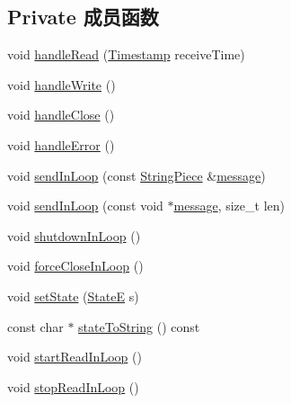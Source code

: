 \subsection*{Private 成员函数}
\begin{DoxyCompactItemize}
\item 
void \hyperlink{classmuduo_1_1net_1_1TcpConnection_afca05707020dd916739c07555d4769a0}{handle\+Read} (\hyperlink{classmuduo_1_1Timestamp}{Timestamp} receive\+Time)
\item 
void \hyperlink{classmuduo_1_1net_1_1TcpConnection_ae1d79ff6580eaced59a900144818150d}{handle\+Write} ()
\item 
void \hyperlink{classmuduo_1_1net_1_1TcpConnection_a2cb2baff35786f9caa991e3c47908d91}{handle\+Close} ()
\item 
void \hyperlink{classmuduo_1_1net_1_1TcpConnection_a70b275e63748ddd6da7d2171c540ccff}{handle\+Error} ()
\item 
void \hyperlink{classmuduo_1_1net_1_1TcpConnection_a14a35c653309480bcd7320757152a413}{send\+In\+Loop} (const \hyperlink{classmuduo_1_1StringPiece}{String\+Piece} \&\hyperlink{test13_8cc_a36bd74109f547f7f8198faf5a12d2879}{message})
\item 
void \hyperlink{classmuduo_1_1net_1_1TcpConnection_ac1ba157deb66ada06a5527acad42d9fc}{send\+In\+Loop} (const void $\ast$\hyperlink{test13_8cc_a36bd74109f547f7f8198faf5a12d2879}{message}, size\+\_\+t len)
\item 
void \hyperlink{classmuduo_1_1net_1_1TcpConnection_a4f988229386dc4e5f80cca96e096e074}{shutdown\+In\+Loop} ()
\item 
void \hyperlink{classmuduo_1_1net_1_1TcpConnection_a57afbf2f587b14c9544d81629527b907}{force\+Close\+In\+Loop} ()
\item 
void \hyperlink{classmuduo_1_1net_1_1TcpConnection_a5cefef7ea6272b740592d9dfecbd6c20}{set\+State} (\hyperlink{classmuduo_1_1net_1_1TcpConnection_a8cf72f776f4277c8138a1beaf5185325}{StateE} s)
\item 
const char $\ast$ \hyperlink{classmuduo_1_1net_1_1TcpConnection_ad5814262e3c9cdcdeb4b25e9b18f9b44}{state\+To\+String} () const
\item 
void \hyperlink{classmuduo_1_1net_1_1TcpConnection_a813d02ba7cf0a0263aca2ae970676f44}{start\+Read\+In\+Loop} ()
\item 
void \hyperlink{classmuduo_1_1net_1_1TcpConnection_ab1a8c5f0e39e33c4088dbeef5c2a4864}{stop\+Read\+In\+Loop} ()
\end{DoxyCompactItemize}

